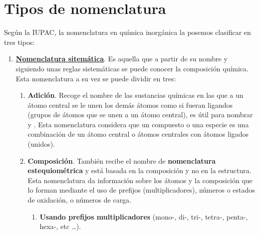 \documentclass[12pt]{article}
\begin{document}
\section{Tipos de nomenclatura}
Según la IUPAC, la nomenclatura en química inorgánica la posemos clasificar en tres tipos:
\begin{enumerate}
    \item \textbf{\uline{Nomenclatura sitemática}}. Es aquella que a partir de su nombre y siguiendo unas reglas sistemáticas se puede conocer la composición química. Esta nomenclatura a su vez se puede dividir en tres:
          \begin{enumerate}
              \item \textbf{Adición}. Recoge el nombre de las sustancias químicas en las que a un átomo central se le unen los demás átomos como si fueran ligandos (grupos de átomos que se unen a un átomo central), es útil para nombrar  y . Esta nomenclatura considera que un compuesto o una especie es una combinación de un átomo central o átomos centrales con átomos ligados (unidos).
              \item \textbf{Composición}. También recibe el nombre de \textbf{nomenclatura estequiométrica} y está basada en la composición y no en la estructura. Esta nomenclatura da información sobre los átomos y la composición que lo forman mediante el uso de prefijos  (multiplicadores), números o estados de oxidación, o números de carga.
                    \begin{enumerate}[label=\itembolascolor{\arabic*}{blue}]
                        \item \textbf{Usando prefijos multiplicadores} (mono-, di-, tri-, tetra-, penta-, hexa-, etc \dots).

\end{enumerate}
\end{enumerate}
\end{enumerate}
\end{document}
